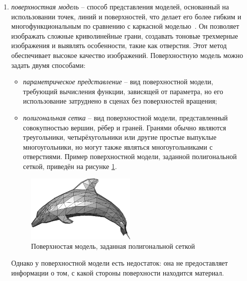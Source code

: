 \begin{enumerate}
	\item \textit{поверхностная модель} -- способ представления моделей, основанный на использовании точек, линий и поверхностей, что делает его более гибким и многофункциональным по сравнению с каркасной моделью~\cite{lit1}. Он позволяет изображать сложные криволинейные грани, создавать тоновые трехмерные изображения и выявлять особенности, такие как отверстия. Этот метод обеспечивает высокое качество изображений. Поверхностную модель можно задать двумя способами:
	\begin{itemize}[label=--]
		\item \textit{параметрическое представление} -- вид поверхностной модели, требующий вычисления функции, зависящей от параметра, но его использование затруднено в сценах без поверхностей вращения;
		\item \textit{полигональная сетка} -- вид поверхностной модели, представленный совокупностью вершин, рёбер и граней. Гранями обычно являются треугольники, четырёхугольники или другие простые выпуклые многоугольники, но могут также являться многоугольниками с отверстиями. Пример поверхностной модели, заданной полигональной сеткой, приведён на рисунке \ref{fig:polygonal-models}.
	\end{itemize}
	\begin{figure}[h] 
		\centering
		\includegraphics[width=0.5\textwidth]{images/polygonal-models.png}
		\caption{Поверхностая модель, заданная полигональной сеткой} 
		\label{fig:polygonal-models} 
	\end{figure}
	Однако у поверхностной модели есть недостаток: она не предоставляет информации о том, с какой стороны поверхности находится материал.
	

\end{enumerate}

